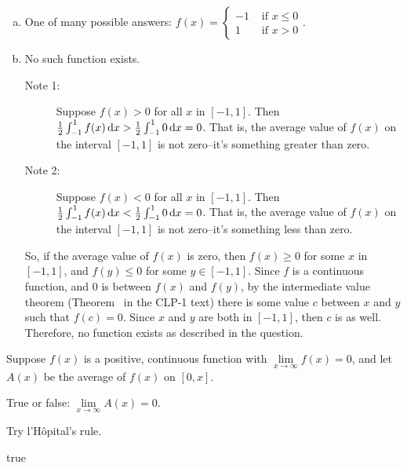 \begin{solution}
\begin{enumerate}[(a)]
\item One of many possible answers: $f(x) = \begin{cases}
-1&\text{ if } x \leq 0\\
1&\text{ if } x > 0
\end{cases}$.
\item No such function exists.
\begin{description}
\item[Note 1:] Suppose $f(x)>0$ for all $x$ in $[-1,1]$. Then $\frac{1}{2}\int_{-1}^1f(x)\,\mathrm{d}x > \frac{1}{2}\int_{-1}^10\,\mathrm{d}x =0 $. That is, the average value of $f(x)$ on the interval $[-1,1]$ is not zero--it's something greater than zero.
\item[Note 2:] Suppose $f(x)<0$ for all $x$ in $[-1,1]$. Then $\frac{1}{2}\int_{-1}^1f(x)\,\mathrm{d}x < \frac{1}{2}\int_{-1}^10\,\mathrm{d}x =0 $. That is, the average value of $f(x)$ on the interval $[-1,1]$ is not zero--it's something less than zero.
\end{description}
So, if the average value of $f(x)$ is zero, then $f(x)\ge 0$ for some $x$ in $[-1,1]$, and $f(y) \le 0$ for some $y \in [-1,1]$. Since $f$ is a continuous function, and 0 is between $f(x)$ and $f(y)$, by the intermediate value theorem (Theorem~ in the CLP-1 text) there is some value $c$ between $x$ and $y$ such that $f(c)=0$. Since $x$ and $y$ are both in $[-1,1]$, then $c$ is as well. Therefore, no function exists as described in the question.
\end{enumerate}
\end{solution}
\begin{question}\label{prob_s2.2:limitavg}
Suppose $f(x)$ is a positive, continuous function with $\lim\limits_{x \to \infty} f(x)=0$, and let $A(x)$ be the average of $f(x)$ on $[0,x]$.

True or false: $\lim\limits_{x \to \infty} A(x) = 0$.
\end{question}
\begin{hint}
Try l'H\^{o}pital's rule.
\end{hint}
\begin{answer}
true
\end{answer}
